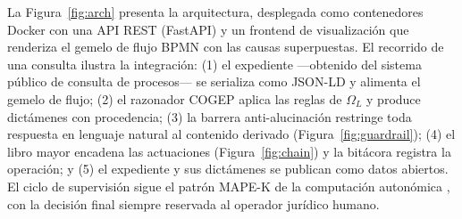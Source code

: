 \documentclass[computers,article,submit,pdftex,moreauthors]{Definitions/mdpi}
\begin{document}
La Figura~\ref{fig:arch} presenta la arquitectura, desplegada como contenedores Docker con una API REST (FastAPI) y un frontend de visualización que renderiza el gemelo de flujo BPMN con las causas superpuestas. El recorrido de una consulta ilustra la integración: (1) el expediente ---obtenido del sistema público de consulta de procesos--- se serializa como JSON-LD y alimenta el gemelo de flujo; (2) el razonador COGEP aplica las reglas de $\Omega_L$ y produce dictámenes con procedencia; (3) la barrera anti-alucinación restringe toda respuesta en lenguaje natural al contenido derivado (Figura~\ref{fig:guardrail}); (4) el libro mayor encadena las actuaciones (Figura~\ref{fig:chain}) y la bitácora registra la operación; y (5) el expediente y sus dictámenes se publican como datos abiertos. El ciclo de supervisión sigue el patrón MAPE-K de la computación autonómica \cite{Kephart2003}, con la decisión final siempre reservada al operador jurídico humano.
\end{document}
